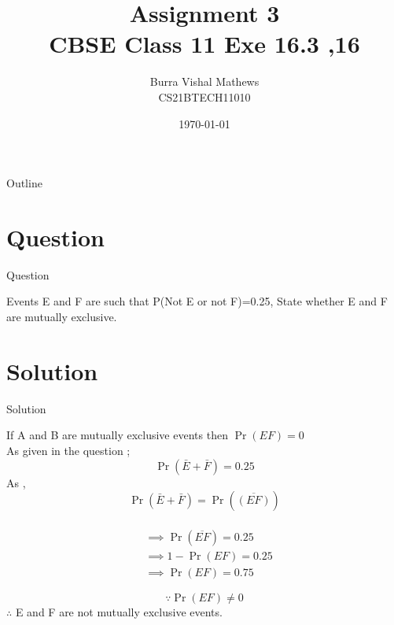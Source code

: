 \documentclass{beamer}
\title{Assignment 3 \\ CBSE Class 11 Exe 16.3 ,16}
\author{Burra Vishal Mathews \\ CS21BTECH11010}
\date{\today}
\providecommand{\pr}[1]{\ensuremath{\Pr\left(#1\right)}}
\begin{document}
\begin{frame}
    \titlepage 
\end{frame}

\logo{}


\begin{frame}{Outline}
    \tableofcontents
\end{frame}


\section{Question}
\begin{frame}{Question}
\begin{block}

    Events E and F are such that P(Not E or not F)=0.25, State whether E and F are mutually exclusive.
\end{block}
\end{frame}


\section{Solution}
\begin{frame}{Solution}

    If A and B are mutually exclusive events then $\pr{EF}=0$\\
    As given in the question ;
    $$\pr{\bar E+\bar F}=0.25 $$
    As , $$\pr{\bar E+\bar F}=\pr{\overline{( E F)}}$$\\
    
    \begin{align}
        &\implies \pr{\overline{E F}}=0.25\\
        &\implies 1-\pr{EF}=0.25\\
        &\implies \pr{EF}=0.75
    \end{align}
    
\end{frame} 

\begin{frame}
    $$\because \pr{EF}\neq 0$$
    $\therefore$ E and F are not mutually exclusive events.

    
\end{frame}
\end{document}
